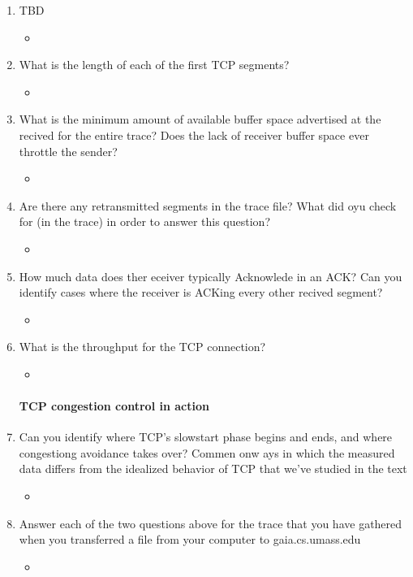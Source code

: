 \documentclass{article}
\begin{document}
\begin{enumerate}
    \item TBD
        \begin{itemize}
          \item 
        \end{itemize}
    \item What is the length of each of the first TCP segments?
        \begin{itemize}
          \item 
        \end{itemize}

    \item What is the minimum amount of available buffer space advertised at the recived for the entire trace?  Does the lack of receiver buffer space ever throttle the sender?
        \begin{itemize}
          \item 
        \end{itemize}

    \item Are there any retransmitted segments in the trace file?  What did oyu check for (in the trace) in order to answer this question?
        \begin{itemize}
          \item 
        \end{itemize}

    \item How much data does ther eceiver typically Acknowlede in an ACK?  Can you identify cases where the receiver is ACKing every other recived segment?
        \begin{itemize}
          \item 
        \end{itemize}

    \item What is the throughput for the TCP connection?
        \begin{itemize}
          \item 
        \end{itemize}
    \paragraph{TCP congestion control in action}
    \item Can you identify where TCP's slowstart phase begins and ends, and where congestiong avoidance takes over?  Commen onw ays in which the measured data differs from the idealized behavior of TCP that we've
    studied in the text
        \begin{itemize}
          \item 
        \end{itemize}

    \item Answer each of the two questions above for the trace that you have gathered when you transferred a file from your computer to gaia.cs.umass.edu
        \begin{itemize}
          \item 
        \end{itemize}
  
    \end{enumerate}
\end{document}
